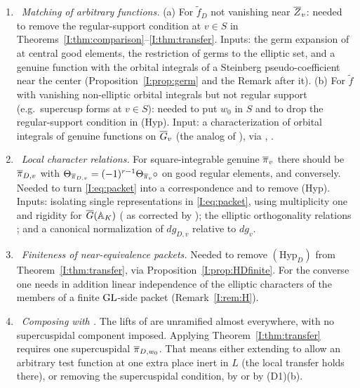 \begin{enumerate}[label=(D\arabic*),leftmargin=3em]
\item \Cv\ \emph{Matching of arbitrary functions.} (a) For $\tilde f_D$ not vanishing near $\overline{Z}_v$: needed to remove the regular-support condition at $v\in S$ in Theorems~\ref{I:thm:comparison}--\ref{I:thm:transfer}. Inputs: the germ expansion of \cite[\S8]{FK86} at central good elements, the restriction of germs to the elliptic set, and a genuine function with the orbital integrals of a Steinberg pseudo-coefficient near the center (Proposition~\ref{I:prop:germ} and the Remark after it). (b) For $\tilde f$ with vanishing non-elliptic orbital integrals but not regular support (e.g.\ supercusp forms at $v\in S$): needed to put $w_0$ in $S$ and to drop the regular-support condition in (Hyp). Input: a characterization of orbital integrals of genuine functions on $\overline{G}_v$ (the analog of \cite[A.3]{DKV84}), via \cite[\S8]{FK86}, \cite[\S1]{KP86}.
\item \Cv\ \emph{Local character relations.} For square-integrable genuine $\overline{\pi}_v$ there should be $\overline{\pi}_{D,v}$ with $\Theta_{\overline{\pi}_{D,v}}=(-1)^{r-1}\Theta_{\overline{\pi}_v}\circ\relax$ on good regular elements, and conversely. Needed to turn \eqref{I:eq:packet} into a correspondence and to remove (Hyp). Inputs: isolating single representations in \eqref{I:eq:packet}, using multiplicity one and rigidity for $\overline{G}(\mathbb{A}_K)$ (\cite[\S\S27--28]{FK86} as corrected by \cite{Zo23}); the elliptic orthogonality relations \cite[\S\S24--25]{FK86}; and a canonical normalization of $dg_{D,v}$ relative to $dg_v$.
\item \Cv\ \emph{Finiteness of near-equivalence packets.} Needed to remove $(\mathrm{Hyp}_D)$ from Theorem~\ref{I:thm:transfer}, via Proposition~\ref{I:prop:HDfinite}. For the converse one needs in addition linear independence of the elliptic characters of the members of a finite $\mathrm{GL}$-side packet (Remark~\ref{I:rem:H}).
\item \Cv\ \emph{Composing with \cite{JC26a}.} The lifts of \cite[Theorem~6.13]{JC26a} are unramified almost everywhere, with no supercuspidal component imposed. Applying Theorem~\ref{I:thm:transfer} requires one supercuspidal $\overline{\pi}_{D,w_0}$. That means either extending \cite{JC26a} to allow an arbitrary test function at one extra place inert in $L$ (the local transfer \cite[Lemma~4.5]{JC26a} holds there), or removing the supercuspidal condition, by \cite{Li14} or by (D1)(b).
\end{enumerate}

